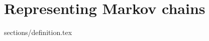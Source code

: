 \documentclass[class=article, crop=false]{standalone}
\begin{document}
\section{Representing Markov chains}
{sections/definition.tex}
\end{document}

